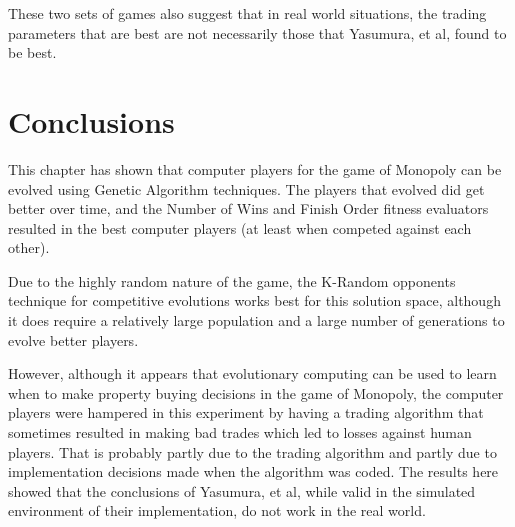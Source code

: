 These two sets of games also suggest that in real world situations, the trading
parameters that are best are not necessarily those that Yasumura, et al, found
to be best. 

\section{Conclusions}

This chapter has shown that computer players for the game of Monopoly can be
evolved using Genetic Algorithm techniques. The players that evolved did get
better over time, and the Number of Wins and Finish Order fitness evaluators
resulted in the best computer players (at least when competed against each
other). 

Due to the highly random nature of the game, the K-Random opponents technique
for competitive evolutions works best for this solution space, although it does
require a relatively large population and a large number of generations to
evolve better players.

However, although it appears that evolutionary computing can be used to learn
when to make property buying decisions in the game of Monopoly, the computer
players were hampered in this experiment by having a trading algorithm that
sometimes resulted in making bad trades which led to losses against human
players. That is probably partly due to the trading algorithm and partly due to
implementation decisions made when the algorithm was coded. The results here
showed that the conclusions of Yasumura, et al, while valid in the simulated
environment of their implementation, do not work in the real world. 